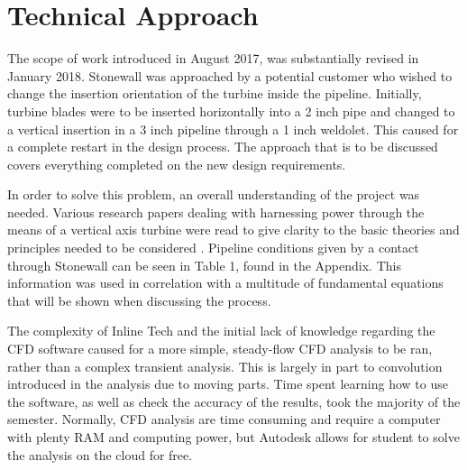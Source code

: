 \documentclass[12pt]{article}
\begin{document}
\section{Technical Approach}
\label{sec:Approach}
\vspace{-0.2in}
\doublespacing

\hspace{0.5 in}The scope of work introduced in August 2017, was substantially revised in January 2018. Stonewall was approached by a potential customer who wished to change the insertion orientation of the turbine inside the pipeline. Initially, turbine blades were to be inserted horizontally into a 2 inch pipe and changed to a vertical insertion in a 3 inch pipeline through a 1 inch weldolet. This caused for a complete restart in the design process. The approach that is to be discussed covers everything completed on the new design requirements.

\hspace{0.5 in}In order to solve this problem, an overall understanding of the project was needed. Various research papers dealing with harnessing power through the means of a vertical axis turbine were read to give clarity to the basic theories and principles needed to be considered \cite{research}\cite{Fluids}. Pipeline conditions given by a contact through Stonewall can be seen in Table 1, found in the Appendix. This information was used in correlation with a multitude of fundamental equations that will be shown when discussing the process.

\hspace{0.5 in}The complexity of Inline Tech and the initial lack of knowledge regarding the CFD software caused for a more simple, steady-flow CFD analysis to be ran, rather than a complex transient analysis. This is largely in part to convolution introduced in the analysis due to moving parts. Time spent learning how to use the software, as well as check the accuracy of the results, took the majority of the semester. Normally, CFD analysis are time consuming and require a computer with plenty RAM and computing power, but Autodesk allows for student to solve the analysis on the cloud for free.
\end{document}
